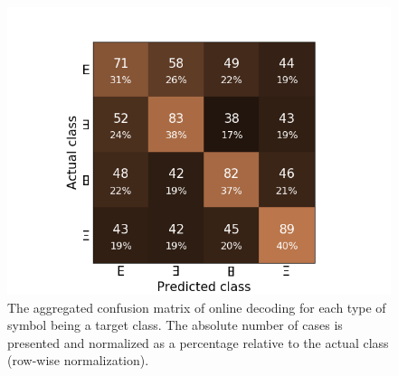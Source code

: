 \documentclass[12pt]{iopart}
\begin{document}
\begin{figure}[!t]
\center
    \includegraphics[trim={1cm 0cm 1cm 1cm},clip,width=0.7\columnwidth]{../images/OnlineConfusion_percent_eight.png}
    \caption{The aggregated confusion matrix of online decoding for each type of symbol being
    a target class. The absolute number of cases is presented and normalized as a percentage 
    relative to the actual class (row-wise normalization).}
\label{fig:onlineconf}
\end{figure}
\end{document}
